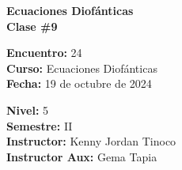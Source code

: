 \begin{center} \textbf
{
    \Large Ecuaciones Diofánticas \\ \vspace{2mm}Clase \#9
}
\end{center}

\begin{multicols}{2}
{
    \textbf{Encuentro:} 24\\
    \textbf{Curso:} Ecuaciones Diofánticas\\
    \textbf{Fecha:} 19 de octubre de 2024\\
    \begin{flushright}
        \textbf{Nivel:} 5\\
        \textbf{Semestre:} II\\
        \textbf{Instructor:} Kenny Jordan Tinoco\\
        \textbf{Instructor Aux:} Gema Tapia
    \end{flushright}
}
\end{multicols}

\thispagestyle{first-page-style}